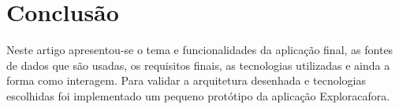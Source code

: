 \documentclass[twocolumn,twoside,11pt,a4paper]{article}
\begin{document}

\section{Conclusão}\label{sec:conclusions}
Neste artigo apresentou-se o tema e funcionalidades da aplicação final, as fontes de dados que são usadas, os requisitos finais, as tecnologias utilizadas e ainda a forma como interagem. Para validar a arquitetura desenhada e tecnologias escolhidas foi implementado um pequeno protótipo da aplicação Exploracafora. 



\renewcommand{\bibname}{Referências}
%
%

%


\end{document}
